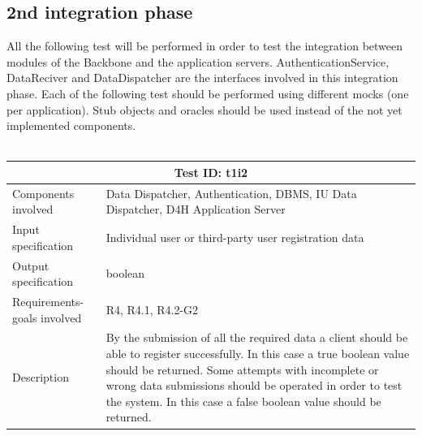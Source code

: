 \subsection{2nd integration phase}
All the following test will be performed in order to test the integration between modules of the Backbone and the application servers. AuthenticationService, DataReciver and DataDispatcher are the interfaces involved in this integration phase. Each of the following test should be performed using different mocks (one per application). Stub objects and oracles should be used instead of the not yet implemented components.
\\
\\
\begin{table}[H]
\centering
\begin{tabular}{ |p{4.5cm}||p{11cm}|  }
 \hline
 \multicolumn{2}{|c|}{Test ID: t1i2} \\
 
 \hline 
 Components involved  	&    Data Dispatcher, Authentication, DBMS, IU Data Dispatcher, D4H Application Server\\
 Input specification  	&  	 Individual user or third-party user registration data\\
Output specification  	& 	  boolean\\
Requirements-goals involved &  R4, R4.1, R4.2-G2\\
Description  	&  By the submission of all the required data a client should be able to register successfully. In this case a true boolean value should be returned. Some attempts with incomplete or wrong data submissions should be operated in order to test the system. In this case a false boolean value should be returned.\\
 \hline
\end{tabular}
\end{table}
